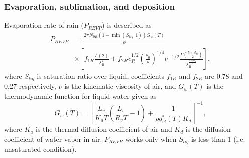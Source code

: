 \subsubsection{Evaporation, sublimation, and deposition}
Evaporation rate of rain ($P_{REVP}$) is described as
\begin{align}
  P_{REVP}&=\frac{2\pi N_{0R}(1-\min(S_{liq},1))G_{w}(T)}{\rho} \nonumber \\
  &\times\left[f_{1R}\frac{\Gamma(2)}{\lambda^{2}_{R}}+f_{2R}c^{1/2}_{R}\left(\frac{\rho_{0}}{\rho}\right)^{1/4}\nu^{-1/2}\frac{\Gamma(\frac{5+d_{R}}{2})}{\lambda^{\frac{5+d_{R}}{2}}_{R}}\right],
\end{align}
where $S_{liq}$ is saturation ratio over liquid, coefficients $f_{1R}$ and $f_{2R}$ are 0.78 and 0.27 respectively, $\nu$ is the kinematic viscosity of air, and $G_{w}(T)$ is the thermodynamic function for liquid water given as
\begin{equation}
  G_{w}(T)=\left[\frac{L_{v}}{K_{a}T}\left(\frac{L_{v}}{R_{v}T}-1\right)+\frac{1}{\rho q^{*}_{vl}(T)K_{d}}\right]^{-1},
\end{equation}
where $K_{a}$ is the thermal diffusion coefficient of air and $K_{d}$ is the diffusion coefficient of water vapor in air. $P_{REVP}$ works only when $S_{liq}$ is less than 1 (i.e. unsaturated condition).

